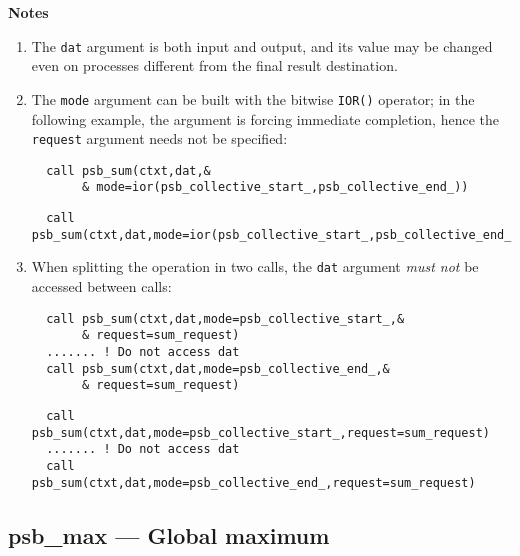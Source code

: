{\par\noindent\large\bfseries Notes}
\begin{enumerate}
\item The \verb|dat| argument is both input and output, and its
  value may be changed even on processes different from the final
  result destination.
\item The \verb|mode| argument can be built with the bitwise
  \verb|IOR()| operator; in the following example, the   argument is
  forcing immediate completion, hence the \verb|request| argument
  needs not be specified: 
\ifpdf
\begin{verbatim}
  call psb_sum(ctxt,dat,&
       & mode=ior(psb_collective_start_,psb_collective_end_))
\end{verbatim}
\else
\begin{center}
    \begin{minipage}[tl]{0.9\textwidth}
\begin{verbatim} 
  call psb_sum(ctxt,dat,mode=ior(psb_collective_start_,psb_collective_end_))
\end{verbatim}
    \end{minipage}
  \end{center}
\fi
  
\item When splitting the operation in two calls, the \verb|dat|
  argument  \emph{must not} be accessed between calls:
\ifpdf
\begin{verbatim}
  call psb_sum(ctxt,dat,mode=psb_collective_start_,&
       & request=sum_request)
  ....... ! Do not access dat 
  call psb_sum(ctxt,dat,mode=psb_collective_end_,&
       & request=sum_request)
\end{verbatim}
\else
\begin{center}
    \begin{minipage}[tl]{0.9\textwidth}
\begin{verbatim} 
  call psb_sum(ctxt,dat,mode=psb_collective_start_,request=sum_request)
  ....... ! Do not access dat 
  call psb_sum(ctxt,dat,mode=psb_collective_end_,request=sum_request)
\end{verbatim}
    \end{minipage}
  \end{center}
\fi
\end{enumerate}



\clearpage\subsection{psb\_max --- Global maximum}

